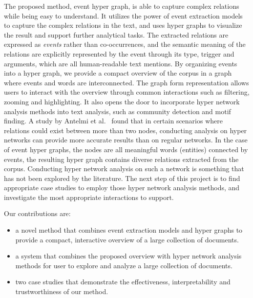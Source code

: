 The proposed method, event hyper graph, is able to capture complex relations while being easy to understand.
It utilizes the power of event extraction models to capture the complex relations in the text, and uses hyper graphs to visualize the result and support further analytical tasks.
The extracted relations are expressed as \textit{events} rather than co-occurrences,
and the semantic meaning of the relations are explicitly represented by the event through its type, trigger and arguments, which are all human-readable text mentions.
By organizing events into a hyper graph, we provide a compact overview of the corpus in a graph where events and words are interconnected. 
The graph form representation allows users to interact with the overview through common interactions such as filtering, zooming and highlighting.
It also opens the door to incorporate hyper network analysis methods into text analysis, such as community detection and motif finding.
A study by Antelmi et al.~\cite{antelmi2020analyzing} found that in certain scenarios where relations could exist between more than two nodes, conducting analysis on hyper networks can provide more accurate results than on regular networks.
In the case of event hyper graphs,
the nodes are all meaningful words (entities) connected by events, the resulting hyper graph contains diverse relations extracted from the corpus.
Conducting hyper network analysis on such a network is something that has not been explored by the literature.
The next step of this project is to find appropriate case studies to employ those hyper network analysis methods, and investigate the most appropriate interactions to support. 

Our contributions are:
\begin{itemize}
    \item a novel method that combines event extraction models and hyper graphs to provide a compact, interactive overview of a large collection of documents.
    \item a system that combines the proposed overview with hyper network analysis methods for user to explore and analyze a large collection of documents.
    \item two case studies that demonstrate the effectiveness, interpretability and trustworthiness of our method.
\end{itemize}

